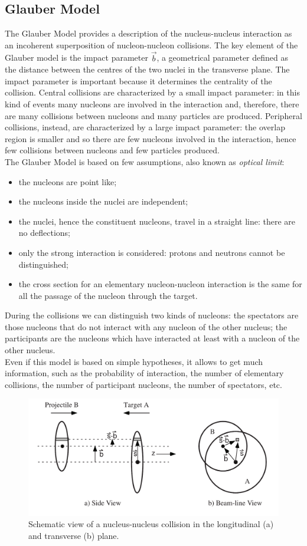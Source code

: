 \subsection{Glauber Model}
The Glauber Model provides a description of the nucleus-nucleus interaction as an incoherent superposition of nucleon-nucleon collisions.
The key element of the Glauber model is the impact parameter $\vec{b}$, a geometrical parameter defined as the distance between the centres of the two nuclei in the transverse plane. The impact parameter is important because it determines the centrality of the collision. Central collisions are characterized by a small impact parameter: in this kind of events many nucleons are involved in the interaction and, therefore, there are many collisions between nucleons and many particles are produced. Peripheral collisions, instead, are characterized by a large impact parameter: the overlap region is smaller and so there are few nucleons involved in the interaction, hence few collisions between nucleons and few particles produced.\\
The Glauber Model is based on few assumptions, also known as \textit{optical limit}:
\begin{itemize}
 \item the nucleons are point like;
 \item the nucleons inside the nuclei are independent;
 \item the nuclei, hence the constituent nucleons, travel in a straight line: there are no deflections;
 \item only the strong interaction is considered: protons and neutrons cannot be distinguished;
 \item the cross section for an elementary nucleon-nucleon interaction is the same for all the passage of the nucleon through the target.
\end{itemize}
During the collisions we can distinguish two kinds of nucleons: the spectators are those nucleons that do not interact with any nucleon of the other nucleus; the participants are the nucleons which have interacted at least with a nucleon of the other nucleus.\\
Even if this model is based on simple hypotheses, it allows to get much information, such as the probability of interaction, the number of elementary collisions, the number of participant nucleons, the number of spectators, etc.
%
\begin{figure}
  \centering
  \includegraphics[scale=0.30]{figures/Impact_parameter.png}
  \caption{Schematic view of a nucleus-nucleus collision in the longitudinal (a) and transverse (b) plane.}
  \label{fig:impact}
\end{figure}
%
